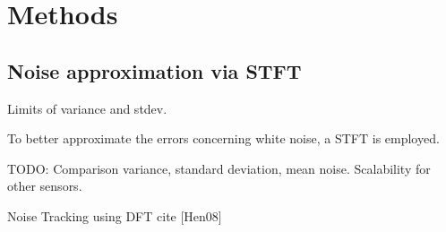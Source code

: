 \chapter{Methods}

\section{Noise approximation via STFT}

Limits of variance and stdev.

To better approximate the errors concerning white noise, a STFT is employed.

TODO: Comparison variance, standard deviation, mean noise. Scalability for other sensors.

Noise Tracking using DFT cite [Hen08]